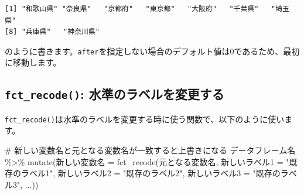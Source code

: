 \documentclass[
  a4paper,
  pandoc,
  ja=standard,
  jafont=haranoaji]{bxjsbook}
\newenvironment{Shaded}{\begin{snugshade}}{\end{snugshade}}
\newcommand{\AttributeTok}[1]{\textcolor[rgb]{0.00,0.48,0.65}{#1}}
\newcommand{\CommentTok}[1]{\textcolor[rgb]{0.37,0.37,0.37}{#1}}
\newcommand{\DecValTok}[1]{\textcolor[rgb]{0.68,0.00,0.00}{#1}}
\newcommand{\FunctionTok}[1]{\textcolor[rgb]{0.28,0.35,0.67}{#1}}
\newcommand{\NormalTok}[1]{\textcolor[rgb]{0.00,0.48,0.65}{#1}}
\newcommand{\OtherTok}[1]{\textcolor[rgb]{0.00,0.48,0.65}{#1}}
\newcommand{\SpecialCharTok}[1]{\textcolor[rgb]{0.37,0.37,0.37}{#1}}
\newcommand{\StringTok}[1]{\textcolor[rgb]{0.13,0.47,0.30}{#1}}
\begin{document}
\begin{Shaded}
\end{Shaded}

\begin{verbatim}
[1] "和歌山県" "奈良県"   "京都府"   "東京都"   "大阪府"   "千葉県"   "埼玉県"  
[8] "兵庫県"   "神奈川県"
\end{verbatim}

のように書きます。\texttt{after}を指定しない場合のデフォルト値は0であるため、最初に移動します。

\hypertarget{fct_recode-ux6c34ux6e96ux306eux30e9ux30d9ux30ebux3092ux5909ux66f4ux3059ux308b}{%
\subsection{\texorpdfstring{\texttt{fct\_recode()}:
水準のラベルを変更する}{fct\_recode(): 水準のラベルを変更する}}\label{fct_recode-ux6c34ux6e96ux306eux30e9ux30d9ux30ebux3092ux5909ux66f4ux3059ux308b}}

\texttt{fct\_recode()}は水準のラベルを変更する時に使う関数で、以下のように使います。

\begin{Shaded}
\begin{Highlighting}[numbers=left,,]
\CommentTok{\# 新しい変数名と元となる変数名が一致すると上書きになる}
\NormalTok{データフレーム名 }\SpecialCharTok{\%\textgreater{}\%}
  \FunctionTok{mutate}\NormalTok{(新しい変数名 }\OtherTok{=} \FunctionTok{fct\_recode}\NormalTok{(元となる変数名, }
\NormalTok{                                   新しいラベル1 }\OtherTok{=} \StringTok{"既存のラベル1"}\NormalTok{,}
\NormalTok{                                   新しいラベル2 }\OtherTok{=} \StringTok{"既存のラベル2"}\NormalTok{,}
\NormalTok{                                   新しいラベル3 }\OtherTok{=} \StringTok{"既存のラベル3"}\NormalTok{,}
\NormalTok{                                   ...))}
\end{Highlighting}
\end{Shaded}
\end{document}

